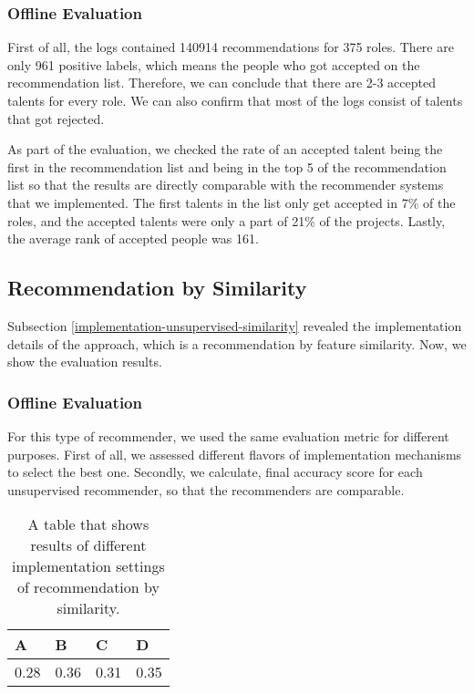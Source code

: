 \subsubsection{Offline Evaluation}

First of all, the logs contained 140914 recommendations for 375 roles. There are only 961 positive labels, which means the people who got accepted on the recommendation list. Therefore, we can conclude that there are 2-3 accepted talents for every role. We can also confirm that most of the logs consist of talents that got rejected. 

As part of the evaluation, we checked the rate of an accepted talent being the first in the recommendation list and being in the top 5 of the recommendation list so that the results are directly comparable with the recommender systems that we implemented. The first talents in the list only get accepted in 7\% of the roles, and the accepted talents were only a part of 21\% of the projects. Lastly, the average rank of accepted people was 161. 

\subsection{Recommendation by Similarity}\label{ev-rec-sim}

Subsection \ref{implementation-unsupervised-similarity} revealed the implementation details of the approach, which is a recommendation by feature similarity. Now, we show the evaluation results. 

\subsubsection{Offline Evaluation}

For this type of recommender, we used the same evaluation metric for different purposes. First of all, we assessed different flavors of implementation mechanisms to select the best one. Secondly, we calculate, final accuracy score for each unsupervised recommender, so that the recommenders are comparable.

\begin{table}[htp]
	\caption[Evaluation mid-results]{A table that shows results of different implementation settings of recommendation by similarity.}\label{tab:evaluation-rec-similarity}
	\centering
	\begin{tabular}{l l l l}
		\toprule
		A & B & C & D \\
		\midrule
		0.28 & 0.36 & 0.31 & 0.35 \\
		\bottomrule
	\end{tabular}
\end{table}

